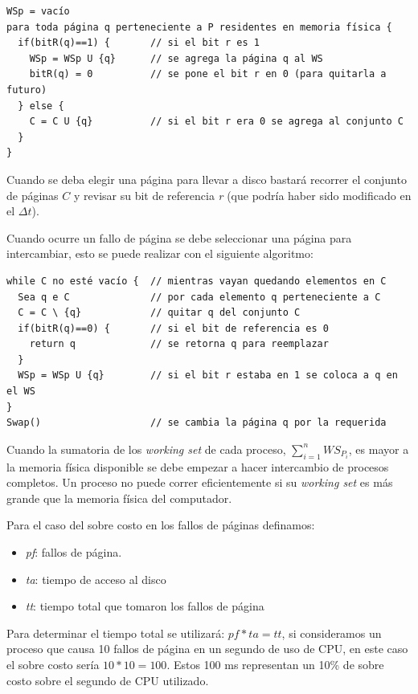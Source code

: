 \begin{verbatim}
WSp = vacío
para toda página q perteneciente a P residentes en memoria física {
  if(bitR(q)==1) {       // si el bit r es 1
    WSp = WSp U {q}      // se agrega la página q al WS
    bitR(q) = 0          // se pone el bit r en 0 (para quitarla a futuro)
  } else {
    C = C U {q}          // si el bit r era 0 se agrega al conjunto C
  }
}
\end{verbatim}

Cuando se deba elegir una página para llevar a disco bastará recorrer el conjunto de páginas $C$ y revisar su bit de referencia \textit{r} (que podría haber sido modificado en el $\Delta t$).

Cuando ocurre un fallo de página se debe seleccionar una página para intercambiar, esto se puede realizar con el siguiente algoritmo:

\begin{verbatim}
while C no esté vacío {  // mientras vayan quedando elementos en C
  Sea q e C              // por cada elemento q perteneciente a C
  C = C \ {q}            // quitar q del conjunto C
  if(bitR(q)==0) {       // si el bit de referencia es 0
    return q             // se retorna q para reemplazar
  }
  WSp = WSp U {q}        // si el bit r estaba en 1 se coloca a q en el WS
}
Swap()                   // se cambia la página q por la requerida
\end{verbatim}

Cuando la sumatoria de los \textit{working set} de cada proceso, $\sum_{i=1}^{n} {WS_{P_i}}$, es mayor a la memoria física disponible se debe empezar a hacer intercambio de procesos completos. Un proceso no puede correr eficientemente si su \textit{working set} es más grande que la memoria física del computador.

Para el caso del sobre costo en los fallos de páginas definamos:

\begin{itemize}
	\item \textit{pf}: fallos de página.
	\item \textit{ta}: tiempo de acceso al disco
	\item \textit{tt}: tiempo total que tomaron los fallos de página
\end{itemize}

Para determinar el tiempo total se utilizará: $pf * ta = tt$, si consideramos un proceso que causa 10 fallos de página en un segundo de uso de CPU, en este caso el sobre costo sería $10 * 10 = 100$. Estos 100 ms representan un 10\% de sobre costo sobre el segundo de CPU utilizado.

